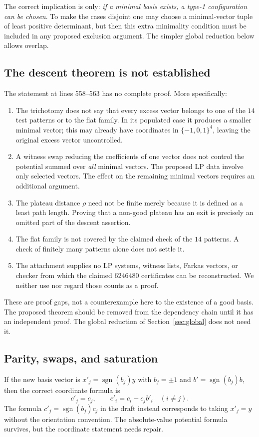 \documentclass[11pt,reqno]{amsart}
\theoremstyle{definition}
\newcommand{\sgn}{\operatorname{sgn}}
\begin{document}
The correct implication is only: \emph{if a minimal basis exists, a
type-1 configuration can be chosen}. To make the cases disjoint one
may choose a minimal-vector tuple of least positive determinant, but
then this extra minimality condition must be included in any proposed
exclusion argument. The simpler global reduction below allows overlap.

\subsection{The descent theorem is not established}
The statement at lines 558--563 has no complete proof. More specifically:
\begin{enumerate}
\item The trichotomy does not say that every excess vector belongs to
one of the $14$ test patterns or to the flat family. In its populated
case it produces a smaller minimal vector; this may already have
coordinates in $\{-1,0,1\}^4$, leaving the original excess vector
uncontrolled.
\item A witness swap reducing the coefficients of one vector does not
control the potential summed over \emph{all} minimal vectors. The
proposed LP data involve only selected vectors. The effect on the
remaining minimal vectors requires an additional argument.
\item The plateau distance $\rho$ need not be finite merely because it
is defined as a least path length. Proving that a non-good plateau has
an exit is precisely an omitted part of the descent assertion.
\item The flat family is not covered by the claimed check of the $14$
patterns. A check of finitely many patterns alone does not settle it.
\item The attachment supplies no LP systems, witness lists, Farkas
vectors, or checker from which the claimed $6246480$ certificates can
be reconstructed. We neither use nor regard those counts as a proof.
\end{enumerate}
These are proof gaps, not a counterexample here to the existence of a
good basis. The proposed theorem should be removed from the dependency
chain until it has an independent proof. The global reduction of
Section~\ref{sec:global} does not need it.

\subsection{Parity, swaps, and saturation}
If the new basis vector is $x'_j=\sgn(b_j)y$ with $b_j=\pm1$ and
$b'=\sgn(b_j)b$, then the correct coordinate formula is
\[
 c'_j=c_j,\qquad c'_i=c_i-c_jb'_i\quad(i\ne j).
\]
The formula $c'_j=\sgn(b_j)c_j$ in the draft instead corresponds to
taking $x'_j=y$ without the orientation convention. The absolute-value
potential formula survives, but the coordinate statement needs repair.
\end{document}
